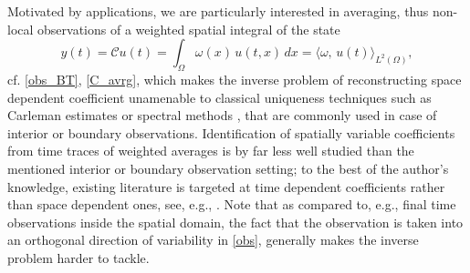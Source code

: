 \documentclass[12pt]{article}
\newcommand\coilsens{\omega}
\begin{document}
Motivated by applications, we are particularly interested in averaging, thus non-local  observations of a weighted spatial integral of the state
\begin{equation*}%
y(t)=\mathcal{C}u(t)=\int_\Omega \coilsens(x)\,u(t,x) \, dx =\langle \coilsens,\,u(t)\rangle_{L^2(\Omega)},
\end{equation*}
cf. \eqref{obs_BT}, \eqref{C_avrg}, which makes the inverse problem of reconstructing space dependent coefficient unamenable to classical uniqueness techniques such as Carleman estimates \cite{Klibanov:1992,YamamotoCarleman:2025} or spectral methods 
\cite{KianLiLiuYamamoto:2021,Pierce:1979}, that are commonly used in case of interior or boundary observations. 
Identification of spatially variable coefficients from time traces of weighted averages is by far less well studied than the mentioned interior or boundary observation setting; to the best of the author's knowledge, existing literature is targeted at time dependent coefficients rather than space dependent ones, see, e.g., \cite{HazaneeLesnicIsmailovKerimov:2019,KerimovNazimIsmailov:2012,VanBockstalKhompysh:2026}.
Note that as compared to, e.g., final time observations inside the spatial domain, the fact that the observation is taken into an orthogonal direction of variability in \eqref{obs}, generally makes the inverse problem harder to tackle.  

\medskip
\end{document}
